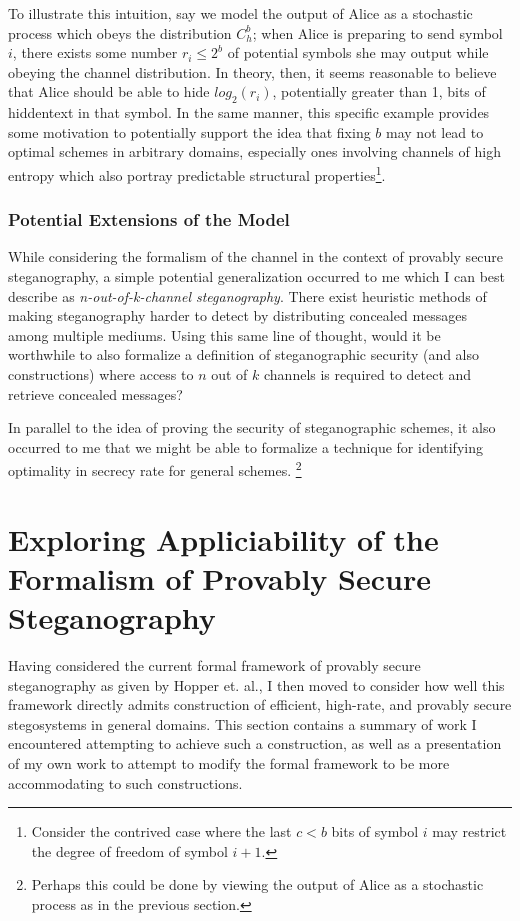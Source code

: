 \documentclass{article}
\begin{document}
To illustrate this intuition, say we model the output of Alice as a stochastic process which obeys the distribution $C_h^{b}$; when Alice is preparing to send symbol $i$, there exists some number $r_i \leq 2^b$ of potential symbols she may output while obeying the channel distribution.  In theory, then, it seems reasonable to believe that Alice should be able to hide $log_2(r_i)$, potentially greater than 1, bits of hiddentext in that symbol.  In the same manner, this specific example provides some motivation to potentially support the idea that fixing $b$ may not lead to optimal schemes in arbitrary domains, especially ones involving channels of high entropy which also portray predictable structural properties\footnote{Consider the contrived case where the last $c < b$ bits of symbol $i$ may restrict the degree of freedom of symbol $i+1$.}.

\subsubsection{Potential Extensions of the Model}

While considering the formalism of the channel in the context of provably secure steganography, 
a simple potential generalization occurred to me which I can best describe as \textit{n-out-of-k-channel steganography}.  There exist heuristic methods of making steganography harder to detect by distributing concealed messages among multiple mediums.  Using this same line of thought, would it be worthwhile to also formalize a definition of steganographic security (and also constructions) where access to $n$ out of $k$ channels is required to 
detect and retrieve concealed messages?

In parallel to the idea of proving the security of steganographic schemes, it also occurred to me that we might be able to formalize 
a technique for identifying optimality in secrecy rate for general schemes. \footnote{Perhaps this could be done by viewing the output 
of Alice as a stochastic process as in the previous section.}

\section{Exploring Appliciability of the Formalism of Provably Secure Steganography}

Having considered the current formal framework of provably secure steganography as given by 
Hopper et. al., I then moved to consider how well this framework directly admits construction of 
efficient, high-rate, and provably secure stegosystems in general domains.  This section 
contains a summary of work I encountered attempting to achieve such a construction, as well 
as a presentation of my own work to attempt to modify the formal framework to be more accommodating 
to such constructions.
\end{document}
